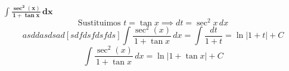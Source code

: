 $\displaystyle \mathbf{\int \frac{\sec^2(x)}{1+\tan x}\,dx}$
\nopagebreak
\[
\text{Sustituimos } t = \tan x \implies dt = \sec^2 x\, dx
\]
\[asddasdsad[sdfdsfdsfds]
\int \frac{\sec^2(x)}{1+\tan x}\,dx = \int \frac{dt}{1+t} = \ln|1+t| + C
\]
\[
\boxed{\displaystyle 
\int \frac{\sec^2(x)}{1+\tan x}\,dx = \ln|1+\tan x| + C
}
\]
